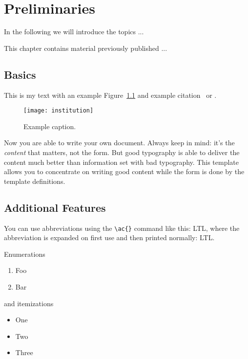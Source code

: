 \chapter{Preliminaries} \label{ch:prelim}

In the following we will  introduce the topics ... 


\begin{chapternotes}
  This chapter contains material previously published ...
\end{chapternotes}

\section{Basics}

This is my text with an example Figure~\ref{fig:example} and example
citation~\cite{Hor51} or \textcite{Hor51}. 

\begin{figure}
	\centering
	\texttt{[image: institution]}
	\caption{Example caption.}
	\label{fig:example}
\end{figure}

Now you are able to write your own document. Always keep in mind: it's
the \emph{content} that matters, not the form. But good typography is
able to deliver the content much better than information set with bad
typography. This template allows you to concentrate on writing good
content while the form is done by the template definitions.

\section{Additional Features}

You can use abbreviations using the \verb+\ac{}+ command like this: \ac{LTL}, 
where the abbreviation is expanded on first use and then printed normally: \ac{LTL}. 

Enumerations
\begin{enumerate}
	\item Foo
	\item Bar
\end{enumerate}

and itemizations
\begin{itemize}
	\item One
	\item Two
	\item Three
\end{itemize}

